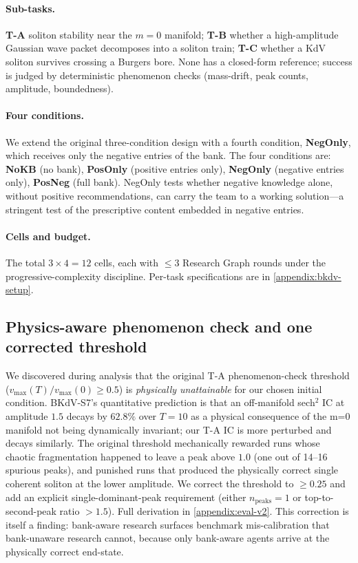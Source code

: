 \paragraph{Sub-tasks.} \textbf{T-A} soliton stability near the $m=0$
manifold; \textbf{T-B} whether a high-amplitude Gaussian wave packet
decomposes into a soliton train; \textbf{T-C} whether a KdV soliton survives
crossing a Burgers bore. None has a closed-form reference; success is judged
by deterministic phenomenon checks (mass-drift, peak counts, amplitude,
boundedness).

\paragraph{Four conditions.} We extend the original three-condition design
with a fourth condition, \textbf{NegOnly}, which receives only the negative
entries of the bank. The four conditions are: \textbf{NoKB} (no bank),
\textbf{PosOnly} (positive entries only), \textbf{NegOnly} (negative entries
only), \textbf{PosNeg} (full bank). NegOnly tests whether negative knowledge
alone, without positive recommendations, can carry the team to a working
solution---a stringent test of the prescriptive content embedded in negative
entries.

\paragraph{Cells and budget.} The total $3 \times 4 = 12$ cells, each with
$\leq 3$ Research Graph rounds under the progressive-complexity discipline.
Per-task specifications are in \cref{appendix:bkdv-setup}.

\subsection{Physics-aware phenomenon check and one corrected threshold}
\label{sec:eval-correction}

We discovered during analysis that the original T-A phenomenon-check
threshold ($v_{\max}(T)/v_{\max}(0) \geq 0.5$) is \emph{physically
unattainable} for our chosen initial condition. BKdV-S7's quantitative
prediction is that an off-manifold sech$^2$ IC at amplitude $1.5$ decays by
$62.8\%$ over $T{=}10$ as a physical consequence of the m{=}0 manifold not
being dynamically invariant; our T-A IC is more perturbed and decays
similarly. The original threshold mechanically rewarded runs whose
chaotic fragmentation happened to leave a peak above $1.0$ (one out of
14--16 spurious peaks), and punished runs that produced the physically
correct single coherent soliton at the lower amplitude. We correct the
threshold to $\geq 0.25$ and add an explicit single-dominant-peak requirement
(either $n_\text{peaks} = 1$ or top-to-second-peak ratio $> 1.5$). Full
derivation in \cref{appendix:eval-v2}. This correction is itself a finding:
bank-aware research surfaces benchmark mis-calibration that bank-unaware
research cannot, because only bank-aware agents arrive at the physically
correct end-state.

